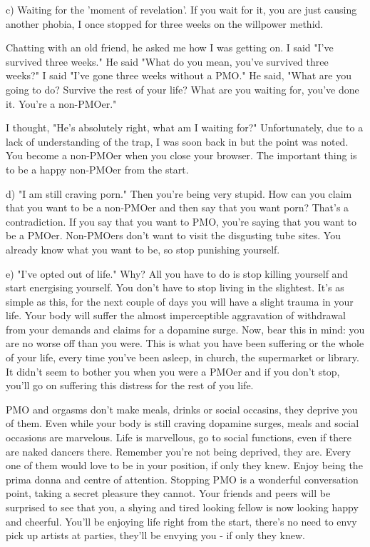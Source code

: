       c) Waiting for the 'moment of revelation'. If you wait for it, you are just causing another phobia, I once stopped for three weeks on the willpower methid.

      Chatting with an old friend, he asked me how I was getting on.
      I said "I've survived three weeks."
      He said "What do you mean, you've survived three weeks?"
      I said "I've gone three weeks without a PMO."
      He said, "What are you going to do? Survive the rest of your life? What are you waiting for, you've done it. You're a non-PMOer."

      I thought, "He's absolutely right, what am I waiting for?" Unfortunately, due to a lack of understanding of the trap, I was soon back in but the point was noted. You become a non-PMOer when you close your browser. The important thing is to be a happy non-PMOer from the start.

      d) "I am still craving porn." Then you're being very stupid. How can you claim that you want to be a non-PMOer and then say that you want porn? That's a contradiction. If you say that you want to PMO, you're saying that you want to be a PMOer. Non-PMOers don't want to visit the disgusting tube sites. You already know what you want to be, so stop punishing yourself.

      e) "I've opted out of life." Why? All you have to do is stop killing yourself and start energising yourself. You don't have to stop living in the slightest. It's as simple as this, for the next couple of days you will have a slight trauma in your life. Your body will suffer the almost imperceptible aggravation of withdrawal from your demands and claims for a dopamine surge. Now, bear this in mind: you are no worse off than you were. This is what you have been suffering or the whole of your life, every time you've been asleep, in church, the supermarket or library. It didn't seem to bother you when you were a PMOer and if you don't stop, you'll go on suffering this distress for the rest of you life.

      PMO and orgasms don't make meals, drinks or social occasins, they deprive you of them. Even while your body is still craving dopamine surges, meals and social occasions are marvelous. Life is marvellous, go to social functions, even if there are naked dancers there. Remember you're not being deprived, they are. Every one of them would love to be in your position, if only they knew. Enjoy being the prima donna and centre of attention. Stopping PMO is a wonderful conversation point, taking a secret pleasure they cannot. Your friends and peers will be surprised to see that you, a shying and tired looking fellow is now looking happy and cheerful. You'll be enjoying life right from the start, there's no need to envy pick up artists at parties, they'll be envying you - if only they knew.

